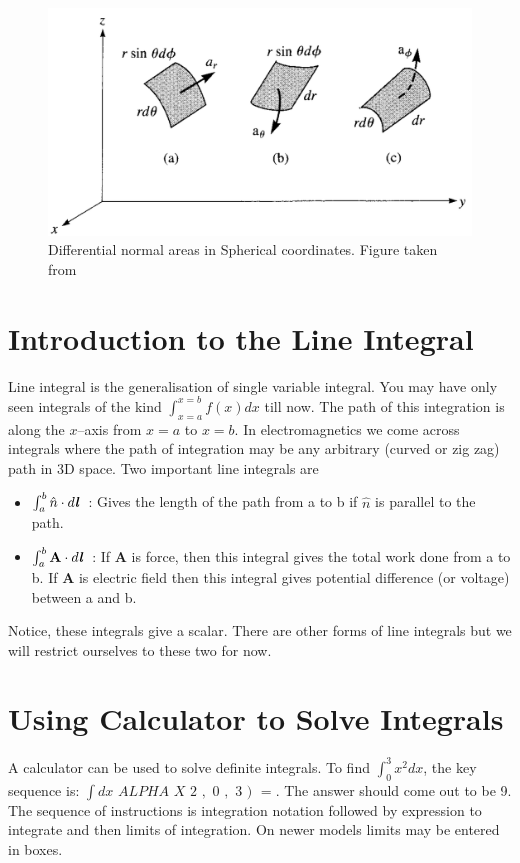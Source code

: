 \documentclass[12pt,a4paper]{article}
\begin{document}
\begin{figure}[h]
\centering
\includegraphics[scale=0.3]{Figure3-6S.png}
\caption{Differential normal areas in Spherical coordinates. Figure taken from~\cite[Figure 3.6, page 57]{Sadiku}}
\label{Spherical-differential-area}
\end{figure}
\section{Introduction to the Line Integral}
Line integral is the generalisation of single variable integral. You may have only seen integrals of the kind $\int_{x=a}^{x=b} f(x)dx$ till now. The path of this integration is along the $x$--axis from $x=a$ to $x=b$. In electromagnetics we come across integrals where the path of integration may be any arbitrary (curved or zig zag) path in 3D space. Two important line integrals are
\begin{itemize}
\item $\int_{a}^{b}\hat n\cdot d\textbf{\textit{l}}$~: Gives the length of the path from a to b if $\hat n$ is parallel to the path.
\item $\int_{a}^{b}\textbf{A}\cdot d\textbf{\textit{l}}$~: If \textbf{A} is force, then this integral gives the total work done from a to b. If \textbf{A} is electric field then this integral gives potential difference (or voltage) between a and b.
\end{itemize}
Notice, these integrals give a scalar. There are other forms of line integrals but we will restrict ourselves to these two for now.
\section{Using Calculator to Solve Integrals}
A calculator can be used to solve definite integrals. To find $\int_{0}^{3}x^2dx$, the key sequence is: $\boxed{\int dx}$ $\boxed{ALPHA}$ $\boxed{X}$ \fbox{\textasciicircum} $\boxed{2}$ $\boxed{,}$ $\boxed{0}$ $\boxed{,}$ $\boxed{3}$ $\boxed{)}$ $\boxed{=}$. The answer should come out to be 9. The sequence of instructions is integration notation followed by expression to integrate and then limits of integration. On newer models limits may be entered in boxes.
\end{document}
